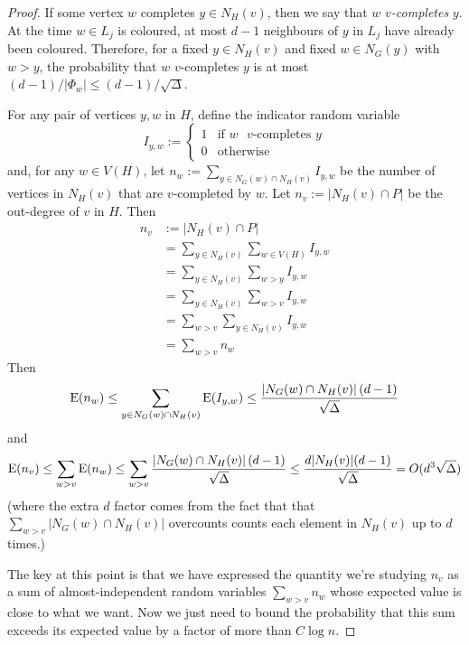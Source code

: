 \documentclass[kpfonts]{patmorin}
\newcommand{\defin}[1]{\emph{\color{brightmaroon}#1}}
\begin{document}
\begin{proof}


  If some vertex $w$ completes $y\in N_H(v) $, then we say that $w$ \defin{$v$-completes} $y$.  At the time $w\in L_j$ is coloured, at most $d-1$ neighbours of $y$ in $L_j$ have already been coloured.  Therefore, for a fixed $y\in N_H(v)$ and fixed $w\in N_G(y)$ with $w>y$, the probability that $w$ $v$-completes $y$ is at most $(d-1)/|\Phi_w|\le (d-1)/\sqrt{\Delta}$.

  For any pair of vertices $y,w$ in $H$, define the indicator random variable
  \[
    I_{y,w} := \begin{cases}
      1 & \text{if $w$ $v$-completes $y$} \\
      0 & \text{otherwise}
    \end{cases}
  \]
  and, for any $w\in V(H)$, let $n_w:=\sum_{y\in N_G(w)\cap N_H(v)} I_{y,w}$ be the number of vertices in $N_H(v)$ that are $v$-completed by $w$.  Let $n_v:=|N_H(v)\cap P|$ be the out-degree of $v$ in $H$.  Then
  \begin{align*}  n_v
    & :=|N_H(v)\cap P| \\
    & = \sum_{y\in N_H(v)} \sum_{w\in V(H)}  I_{y,w} \\
    & = \sum_{y\in N_H(v)} \sum_{w>y}  I_{y,w} \\
    & = \sum_{y\in N_H(v)} \sum_{w>v}  I_{y,w} \\
    & = \sum_{w>v} \sum_{y\in N_H(v)} I_{y,w} \\
    & = \sum_{w>v} n_w
  \end{align*}
  Then
  \[
      \mathrm{E}(n_w) \le \sum_{y\in N_G(w)\cap N_H(v)} \mathrm{E}(I_{y,w})
      \le \frac{|N_G(w)\cap N_H(v)|\, (d-1)}{\sqrt{\Delta}}
  \]
  and
  \[
      \mathrm{E}(n_v) \le \sum_{w>v} \mathrm{E}(n_w)
      \le \sum_{w>v} \frac{|N_G(w)\cap N_H(v)|\, (d-1)}{\sqrt{\Delta}}
      \le \frac{d|N_H(v)|(d-1)}{\sqrt{\Delta}} = O(d^3\sqrt{\Delta})
  \]
  (where the extra $d$ factor comes from the fact that that $\sum_{w>v}|N_G(w)\cap N_H(v)|$ overcounts counts each element in $N_H(v)$ up to $d$ times.)

  The key at this point is that we have expressed the quantity we're studying $n_v$ as a sum of almost-independent random variables $\sum_{w> v} n_w$ whose expected value is close to what we want.  Now we just need to bound the probability that this sum exceeds its expected value by a factor of more than $C\log n$.
\end{proof}
\end{document}
